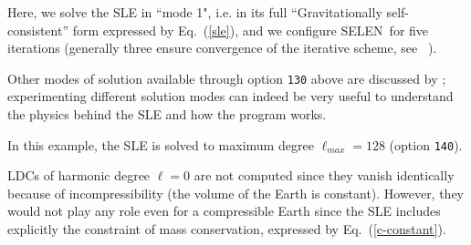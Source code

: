\documentclass[11pt,fleqn,a4paper,titlepage]{article}
\newcommand\selen{\textsf{SELEN~}}
\begin{document}
\vspace{0.4cm}

{\color{Cyan}{\scriptsize\begin{verbatim}
    ...
    ====> SOLUTION of the SLE -----------------------------------------------------
    130    Iterations & mode of solution                              '5'    '1' 	    			 	
    Modes:  1= Gravitationally self-consistent (GSC)
            2= Elastic GSC / 3="Eustatic" / 4="Woodward" / 5="No Ice" 
\end{verbatim} }}
\noindent Here, we solve the SLE in ``mode 1", i.e. in its full ``Gravitationally self-consistent'' form expressed by Eq.~(\ref{sle}), and we configure \selen for five iterations (generally three 
ensure convergence of the iterative scheme, see \citeauthor{Spada_and_Stocchi_2007}~\citeyear{Spada_and_Stocchi_2007}). 

Other modes of solution available through option \texttt{130} above are discussed by \citet{Spada_and_Stocchi_2007}; experimenting different solution modes can indeed be 
very useful to understand the physics behind the SLE and how the program works. 

\vspace{0.4cm}

{\color{Cyan}{\scriptsize\begin{verbatim}
    ...
    ====> MAXIMUM HARMONIC DEGREE -------------------------------------------------
    140    LMAX     				                       '128'  
    
    ====> REFERENCE FRAME ---------------------------------------------------------
    145    Includes degree 1 Love numbers (CM/CE frames)             'y'  'CM'   
    
    ====> TEGMARK RESOLUTION ------------------------------------------------------
    150    R                  				             '33'                         
    151    Prepare a new pixel table (y/n, filename)         'y' 'px-table-r44.dat'    ...
\end{verbatim} }}
\noindent In this example, the SLE is solved to maximum degree $\ell_{max}=128$ (option \texttt{140}). 

LDCs of harmonic degree $\ell=0$ are not computed since they vanish identically because of incompressibility (the volume of the Earth is constant). However, they would not play any role even for a compressible Earth since the SLE includes explicitly the constraint of mass conservation, expressed by Eq.~(\ref{c-constant}). 
\end{document}
